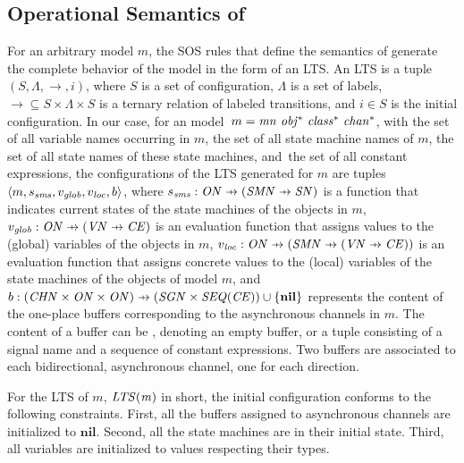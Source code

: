 \subsection{Operational Semantics of \SLCO}
\label{sec:reusable-correct-transformations:operational_semantics}
For an arbitrary model $m$, the SOS rules that define the semantics of \SLCO generate the complete behavior of the model in the form of an LTS.
An LTS is a tuple $(S, \Lambda, \rightarrow, i)$, where $S$ is a set of configuration, $\Lambda$  is a set of labels, $ \rightarrow \subseteq S \times \Lambda \times S$ is a ternary relation of labeled transitions, and $i\in S$ is the initial configuration.
In our case, for an \SLCO model~$m=\it{mn}~\it{obj^*}~\it{class^*}~\it{chan^*}$,
with \VariableNames the set of all variable names occurring in $m$,
\StateMachineNames the set of all state machine names of $m$,
\StateNames the set of all state names of these state machines,
and~\ConstantExpressions the set of all constant expressions,
the configurations of the LTS generated for $m$ are tuples $\langle m, s_{\it{sms}}, v_{\it{glob}}, v_{\it{loc}}, b \rangle$, where
%
$\ssms : \ObjectNames \pfun (\StateMachineNames \pfun \StateNames)$ is a function that indicates current states of the state machines of the objects in $m$,
%
$\vglob : \ObjectNames \pfun (\VariableNames \pfun \ConstantExpressions)$ is an evaluation function that assigns values to the (global) variables of the objects in $m$,
%
$\vloc : \ObjectNames \pfun (\StateMachineNames \pfun (\VariableNames \pfun \ConstantExpressions))$ is an evaluation function that assigns concrete values to the (local) variables of the state machines of the objects of model $m$,
%
and $\buf : (\ChannelNames \times \ObjectNames \times \ObjectNames) \pfun (\SignalNames \times \it{SEQ}(\ConstantExpressions)) \cup \{\nil\}$ represents the content of the one-place buffers corresponding to the asynchronous channels in $m$.
The content of a buffer can be  \nil, denoting an empty buffer, or a tuple consisting of a signal name and a sequence of constant expressions.
Two buffers are associated to each bidirectional, asynchronous channel, one for each direction.

For the LTS of $m$, $\it{LTS}(m)$ in short, the initial configuration conforms to the following constraints.
First, all the buffers assigned to asynchronous channels are initialized to $\textbf{nil}$.
Second, all the state machines are in their initial state.
Third, all variables are initialized to values respecting their types.

